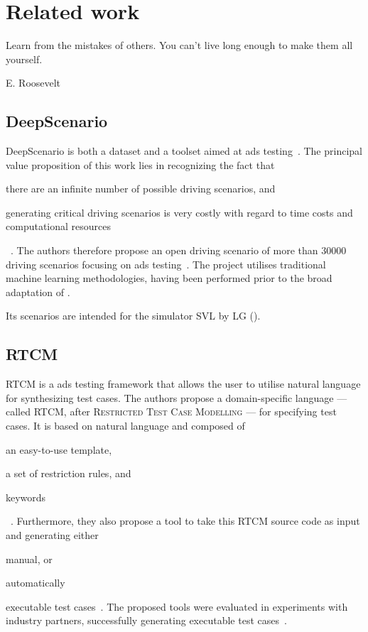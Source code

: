 \chapter{Related work}\label{sec:relatedWork}

\epigraph{Learn from the mistakes of others. You can't live long enough to make them all yourself.}{E. Roosevelt}

\section{DeepScenario}\label{sec:deepScenario}

DeepScenario is both a dataset and a toolset aimed at \acrlong{ads} testing~\cite{DeepScenario}. The
principal value proposition of this work lies in recognizing the fact that \begin{inparaenum}
  \item there are an infinite number of possible driving scenarios, and
  \item generating critical driving scenarios is very costly with regard to time costs and
  computational resources\end{inparaenum}~\cite[52]{DeepScenario}. The authors therefore propose
an open driving scenario of more than \num{30000} driving scenarios focusing on \acrshort{ads}
testing~\cite[52]{DeepScenario}. The project utilises traditional machine learning
methodologies, having been performed prior to the broad adaptation of .

Its scenarios are intended for the simulator SVL by LG ().

\section{RTCM}

RTCM is a \acrshort{ads} testing framework that allows the user to utilise natural language for
synthesizing test cases. The authors propose a domain-specific language --- called RTCM, after
\textsc{Restricted Test Case Modelling} --- for specifying test cases. It is based on natural language
and composed of \begin{inparaenum}
  \item an easy-to-use template,
  \item a set of restriction rules, and
  \item keywords \end{inparaenum}~\cite[397]{RTCM}.  Furthermore, they also propose a tool to
take this RTCM source code as input and generating either \begin{inparaenum}
  \item manual, or
  \item automatically \end{inparaenum} executable test cases~\cite[397]{RTCM}. The proposed tools
were evaluated in experiments with industry partners, successfully generating executable test
cases~\cite[397]{RTCM}.

